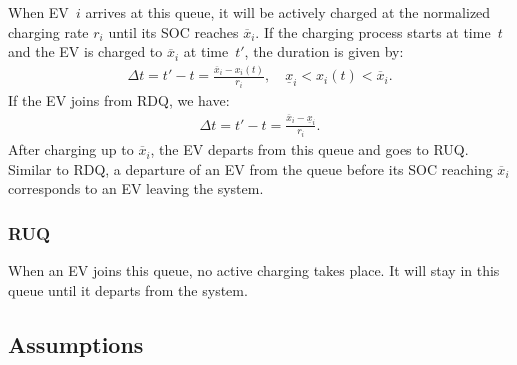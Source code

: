 \documentclass[journal]{IEEEtran}
\begin{document}
When EV~$i$ arrives at this queue, it will be actively charged at the
normalized charging rate $r_i$ until its SOC reaches $\overline{x}_i$.  If the
charging process starts at time~$t$ and the EV is charged to $\overline{x}_i$
at time~$t'$, the duration is given by:
\begin{align}
\Delta t = t' - t = \frac{\overline{x}_i -x_i(t)}{r_i}, \quad
\underline{x}_i < x_i(t) < \overline{x}_i.
\label{q2time1}
\end{align}
If the EV joins from RDQ, we have:
\begin{align}
\Delta t = t' - t = \frac{\overline{x}_i - \underline{x}_i}{r_i}.
\label{q2time2}
\end{align}
After charging up to $\overline{x}_i$, the EV departs from this queue and goes
to RUQ.  Similar to RDQ, a departure of an EV from the queue before its SOC
reaching $\overline{x}_i$ corresponds to an EV leaving the system.

\subsubsection{RUQ}

When an EV joins this queue, no active charging takes place.  It will stay in
this queue until it departs from the system.
 
\subsection{Assumptions} \label{subsec:assumptions}
\end{document}

